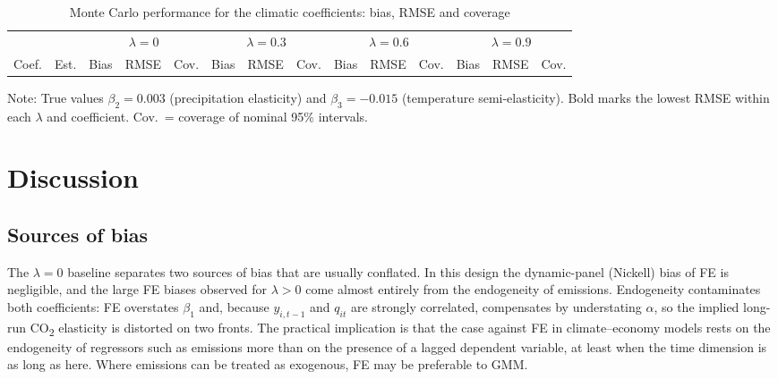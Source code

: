 \documentclass[11pt,a4paper]{article}
\newcommand{\COtwo}{CO\textsubscript{2}}
\begin{document}
\begin{table}[htbp]
\centering
\begin{threeparttable}
\caption{Monte Carlo performance for the climatic coefficients: bias, RMSE and coverage}\label{tab:clim}
\scriptsize
\setlength{\tabcolsep}{3pt}
\begin{tabular}{@{}llrrrrrrrrrrrr@{}}
\toprule
 & & \multicolumn{3}{c}{$\lambda=0$} & \multicolumn{3}{c}{$\lambda=0.3$} & \multicolumn{3}{c}{$\lambda=0.6$} & \multicolumn{3}{c}{$\lambda=0.9$} \\
\cmidrule(lr){3-5}\cmidrule(lr){6-8}\cmidrule(lr){9-11}\cmidrule(lr){12-14}
Coef. & Est. & Bias & RMSE & Cov. & Bias & RMSE & Cov. & Bias & RMSE & Cov. & Bias & RMSE & Cov. \\
\midrule
\bottomrule
\end{tabular}
\begin{tablenotes}\footnotesize
\item Note: True values $\beta_2=0.003$ (precipitation elasticity) and $\beta_3=-0.015$ (temperature semi-elasticity). Bold marks the lowest RMSE within each $\lambda$ and coefficient. Cov.\ = coverage of nominal 95\% intervals.
\end{tablenotes}
\end{threeparttable}
\end{table}

\section{Discussion}\label{sec:discussion}

\subsection{Sources of bias}

The $\lambda=0$ baseline separates two sources of bias that are usually conflated. In this design the dynamic-panel (Nickell) bias of FE is negligible, and the large FE biases observed for $\lambda>0$ come almost entirely from the endogeneity of emissions. Endogeneity contaminates both coefficients: FE overstates $\beta_1$ and, because $y_{i,t-1}$ and $q_{it}$ are strongly correlated, compensates by understating $\alpha$, so the implied long-run \COtwo{} elasticity is distorted on two fronts. The practical implication is that the case against FE in climate--economy models rests on the endogeneity of regressors such as emissions more than on the presence of a lagged dependent variable, at least when the time dimension is as long as here. Where emissions can be treated as exogenous, FE may be preferable to GMM.
\end{document}
